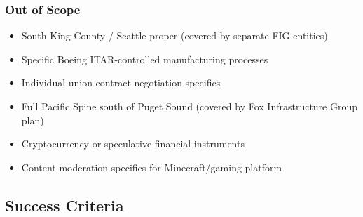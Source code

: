 \documentclass[11pt,letterpaper]{article}
\begin{document}
\subsubsection{Out of Scope}
\begin{itemize}[leftmargin=*]
  \item South King County / Seattle proper (covered by separate FIG entities)
  \item Specific Boeing ITAR-controlled manufacturing processes
  \item Individual union contract negotiation specifics
  \item Full Pacific Spine south of Puget Sound (covered by Fox Infrastructure Group plan)
  \item Cryptocurrency or speculative financial instruments
  \item Content moderation specifics for Minecraft/gaming platform
\end{itemize}

\subsection{Success Criteria}
\end{document}
